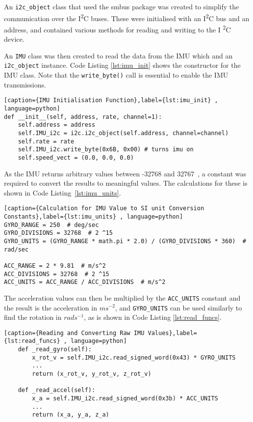 An \verb|i2c_object| class that used the smbus package was created to
simplify the communication over the I\textsuperscript{2}C buses. These
were initialised with an I\textsuperscript{2}C bus and an address, and
contained various methods for reading and writing to the I
\textsuperscript{2}C device.


An \verb|IMU| class was then created to read the data from the IMU which
and an \verb|i2c_object| instance. Code Listing \ref{lst:imu_init} shows
the constructor for the IMU class. Note that the \verb|write_byte()| call
is essential to enable the IMU transmissions.

\begin{lstlisting}[caption={IMU Initialisation Function},label={lst:imu_init} , language=python]
def __init__(self, address, rate, channel=1):
    self.address = address
    self.IMU_i2c = i2c.i2c_object(self.address, channel=channel)
    self.rate = rate
    self.IMU_i2c.write_byte(0x6B, 0x00) # turns imu on
    self.speed_vect = (0.0, 0.0, 0.0)
\end{lstlisting}

As the IMU returns arbitrary values between -32768 and 32767~\cite{MPU6050Datasheet}, a constant was required to convert the results to
meaningful values. The calculations for these is shown in Code
Listing~\ref{lst:imu_units}.

\begin{lstlisting}[caption={Calculation for IMU Value to SI unit Conversion Constants},label={lst:imu_units} , language=python]
GYRO_RANGE = 250  # deg/sec
GYRO_DIVISIONS = 32768  # 2 ^15
GYRO_UNITS = (GYRO_RANGE * math.pi * 2.0) / (GYRO_DIVISIONS * 360)  # rad/sec

ACC_RANGE = 2 * 9.81  # m/s^2
ACC_DIVISIONS = 32768  # 2 ^15
ACC_UNITS = ACC_RANGE / ACC_DIVISIONS  # m/s^2
\end{lstlisting}

The acceleration values can then be multiplied by the \verb|ACC_UNITS|
constant and the result is the acceleration in $ms^{-2}$, and \verb|GYRO_UNITS|
can be used similarly to find the rotation in $rads^{-1}$, as is
shown in Code Listing \ref{lst:read_funcs}.


\begin{lstlisting}[caption={Reading and Converting Raw IMU Values},label={lst:read_funcs} , language=python]
    def _read_gyro(self):
        x_rot_v = self.IMU_i2c.read_signed_word(0x43) * GYRO_UNITS
		...
        return (x_rot_v, y_rot_v, z_rot_v)

    def _read_accel(self):
        x_a = self.IMU_i2c.read_signed_word(0x3b) * ACC_UNITS
		...
        return (x_a, y_a, z_a)
\end{lstlisting}

